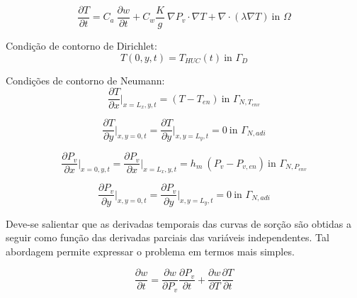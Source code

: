    \begin{equation}
      \label{eq:full_EB}
      \frac{\partial T}{\partial t} = C_a \ \frac{\partial w}{\partial t} +  C_w \frac{K}{g} \ \nabla P_v \cdot \nabla T + \nabla \cdot (\lambda \nabla T) \ \text{in } \Omega
   \end{equation}

   Condição de contorno de Dirichlet:
   \begin{equation}
     \label{eq:dir_bc}
    T(0, y, t) = T_{HUC}(t) \ \text{in } \Gamma_D
   \end{equation}

   Condições de contorno de Neumann:
   \begin{equation}
     \label{eq:neu_bc_T_x}
     \frac{\partial T}{\partial x}\bigg\rvert_{x = L_x, y, t} =  (T - T_{en}) \ \text{in } \Gamma_{N, T_{env}}
   \end{equation}

   \begin{equation}
     \label{eq:neu_bc_T_y}
\frac{\partial T}{\partial y}\bigg\rvert_{x, y=0, t} = \frac{\partial T}{\partial y}\bigg\rvert_{x, y=L_y, t} = 0 \ \text{in } \Gamma_{N, adi}
   \end{equation}

   
   \begin{equation}
     \label{eq:neu_bc_P_x}
     \frac{\partial P_v}{\partial x}\bigg\rvert_{x = 0, y, t} = \frac{\partial P_v}{\partial x}\bigg\rvert_{x = L_x, y, t} =  h_m \ (P_v - P_{v, en}) \ \text{in } \Gamma_{N, P_{env}}
   \end{equation}

   \begin{equation}
     \label{eq:neu_bc_P_y}
    \frac{\partial P_v}{\partial y}\bigg\rvert_{x, y=0, t}= \frac{\partial P_v}{\partial y}\bigg\rvert_{x, y=L_y, t} = 0 \ \text{in }\Gamma_{N, adi}
   \end{equation}


   
    Deve-se salientar que as derivadas temporais das curvas de sorção são
    obtidas a seguir como função das derivadas parciais das variáveis
    independentes. Tal abordagem permite expressar o problema em termos mais simples.

    \begin{equation}
      \label{eq:dwdt}
      \frac{\partial w}{\partial t} = \frac{\partial w}{\partial P_v} \frac{\partial P_v}{\partial t} + \frac{\partial w}{\partial T} \frac{\partial T}{\partial t}
    \end{equation}

